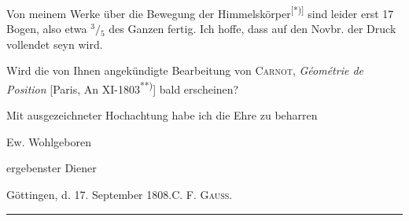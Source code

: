 \par\indent Von meinem Werke über die Bewegung der Himmelskörper\textsuperscript{[*)]} sind leider erst 17 Bogen, also etwa ${}^3\! /\! {}_5$ des Ganzen fertig. Ich hoffe, dass auf den Novbr. der Druck vollendet seyn wird.

\par\indent Wird die von Ihnen angekündigte Bearbeitung von \textsc{Carnot}, \textit{Géométrie de Position} [Paris, An XI-1803\textsuperscript{**)}] bald erscheinen?

\par\indent Mit ausgezeichneter Hochachtung habe ich die Ehre zu beharren
\begin{flushright}Ew. Wohlgeboren\par\medskip ergebenster Diener\end{flushright}
\noindent Göttingen, d. 17. September 1808.\hfill\textsc{C. F. Gauss.}
\par\vfill\noindent\rule{.25\linewidth}{.4pt}\par\smallskip
\begingroup\footnotesize
{}\par
{}\par\endgroup
\clearpage
\endgroup
